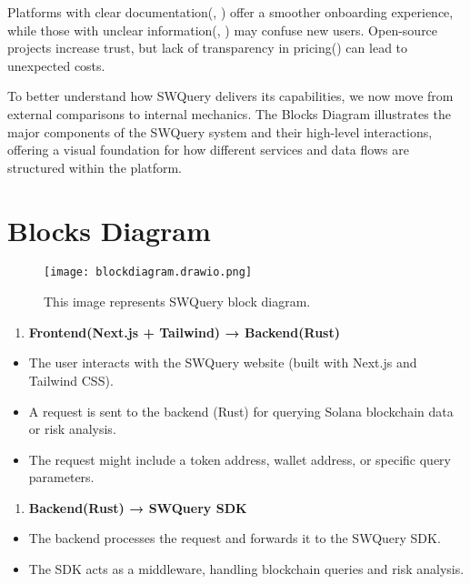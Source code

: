 \documentclass[
]{article}
\providecommand{\tightlist}{%
  \setlength{\itemsep}{0pt}\setlength{\parskip}{0pt}}
\begin{document}
Platforms with clear documentation(\cite{strawberry2025}, \cite{swquery2025}) offer a smoother
onboarding experience, while those with unclear information(\cite{neur2025},
\cite{griffain2025}) may confuse new users. Open-source projects increase trust,
but lack of transparency in pricing(\cite{griffain2025}) can lead to unexpected
costs.

To better understand how SWQuery delivers its capabilities, we now move from external comparisons to internal mechanics. The Blocks Diagram illustrates the major components of the SWQuery system and their high-level interactions, offering a visual foundation for how different services and data flows are structured within the platform.

\hypertarget{blocks-diagram}{%
\section{Blocks Diagram}\label{blocks-diagram}}

\begin{figure}[H]
\centering
\texttt{[image: blockdiagram.drawio.png]}
\caption{\label{fig:blockdiagram}This image represents SWQuery block diagram.}
\end{figure}

\begin{enumerate}
\def\labelenumi{\arabic{enumi}.}
\tightlist
\item
  \textbf{Frontend(Next.js + Tailwind) → Backend(Rust)}
\end{enumerate}

\begin{itemize}
\tightlist
\item
  The user interacts with the SWQuery website (built with Next.js and
  Tailwind CSS).
\item
  A request is sent to the backend (Rust) for querying Solana blockchain
  data or risk analysis.
\item
  The request might include a token address, wallet address, or specific
  query parameters.
\end{itemize}

\begin{enumerate}
\def\labelenumi{\arabic{enumi}.}
\setcounter{enumi}{1}
\tightlist
\item
  \textbf{Backend(Rust) → SWQuery SDK}
\end{enumerate}

\begin{itemize}
\tightlist
\item
  The backend processes the request and forwards it to the SWQuery SDK.
\item
  The SDK acts as a middleware, handling blockchain queries and risk
  analysis.
\end{itemize}
\end{document}
